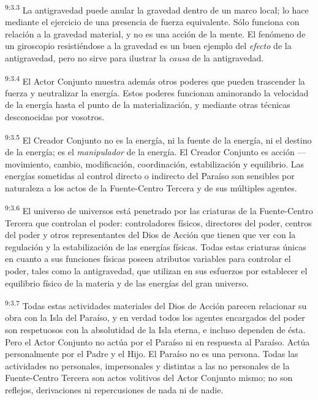 \par
\textsuperscript{9:3.3} La antigravedad puede anular la gravedad dentro de un marco local; lo hace mediante el ejercicio de una presencia de fuerza equivalente. Sólo funciona con relación a la gravedad material, y no es una acción de la mente. El fenómeno de un giroscopio resistiéndose a la gravedad es un buen ejemplo del \textit{efecto} de la antigravedad, pero no sirve para ilustrar la \textit{causa} de la antigravedad.

\par
\textsuperscript{9:3.4} El Actor Conjunto muestra además otros poderes que pueden trascender la fuerza y neutralizar la energía. Estos poderes funcionan aminorando la velocidad de la energía hasta el punto de la materialización, y mediante otras técnicas desconocidas por vosotros.

\par
\textsuperscript{9:3.5} El Creador Conjunto no es la energía, ni la fuente de la energía, ni el destino de la energía; es el \textit{manipulador} de la energía. El Creador Conjunto es acción ---movimiento, cambio, modificación, coordinación, estabilización y equilibrio. Las energías sometidas al control directo o indirecto del Paraíso son sensibles por naturaleza a los actos de la Fuente-Centro Tercera y de sus múltiples agentes.

\par
\textsuperscript{9:3.6} El universo de universos está penetrado por las criaturas de la Fuente-Centro Tercera que controlan el poder: controladores físicos, directores del poder, centros del poder y otros representantes del Dios de Acción que tienen que ver con la regulación y la estabilización de las energías físicas. Todas estas criaturas únicas en cuanto a sus funciones físicas poseen atributos variables para controlar el poder, tales como la antigravedad, que utilizan en sus esfuerzos por establecer el equilibrio físico de la materia y de las energías del gran universo.

\par
\textsuperscript{9:3.7} Todas estas actividades materiales del Dios de Acción parecen relacionar su obra con la Isla del Paraíso, y en verdad todos los agentes encargados del poder son respetuosos con la absolutidad de la Isla eterna, e incluso dependen de ésta. Pero el Actor Conjunto no actúa por el Paraíso ni en respuesta al Paraíso. Actúa personalmente por el Padre y el Hijo. El Paraíso no es una persona. Todas las actividades no personales, impersonales y distintas a las no personales de la Fuente-Centro Tercera son actos volitivos del Actor Conjunto mismo; no son reflejos, derivaciones ni repercusiones de nada ni de nadie.

